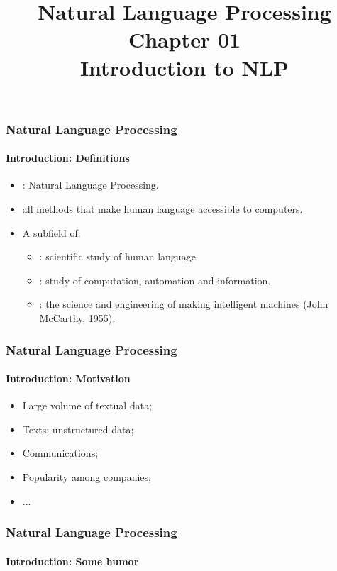 \documentclass[xcolor=table]{beamer}
\title[ESI - NLP: 01- Introduction]%
{Natural Language Processing\\Chapter 01\\Introduction to NLP}
\begin{document}
	
\begin{frame}
\frametitle{Natural Language Processing}
\framesubtitle{Introduction: Definitions}

\begin{itemize}
	\item {}: Natural Language Processing.
	\item all methods that make human language accessible to computers.
\end{itemize}
\begin{minipage}{0.78\textwidth}
\begin{itemize}
	\item A subfield of:
	\begin{itemize}
		\item {}: scientific study of human language.
		\item {}: study of computation, automation and information.
		\item {}: the science and engineering of
		making intelligent machines (John McCarthy, 1955).
	\end{itemize}
\end{itemize}
\end{minipage}
\begin{minipage}{0.20\textwidth}
\end{minipage}
\end{frame}

\begin{frame}
\frametitle{Natural Language Processing}
\framesubtitle{Introduction: Motivation}

\begin{itemize}
	\item Large volume of textual data;
	
	\item Texts: unstructured data;
	
	\item Communications;
	
	\item Popularity among companies;
	
	\item ...
\end{itemize}

\end{frame}

\begin{frame}
\frametitle{Natural Language Processing}
\framesubtitle{Introduction: Some humor}

\begin{center}
\end{center}

\end{frame}
\end{document}
